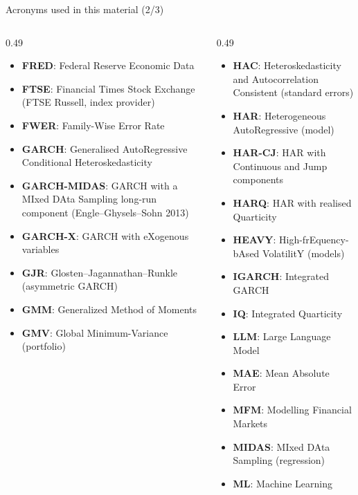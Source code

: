 \begin{frame}{Acronyms used in this material (2/3)}
\begin{columns}[T]
\begin{column}{0.49\textwidth}
\begin{itemize}\setlength{\itemsep}{0pt}
    \item \textbf{FRED}: Federal Reserve Economic Data
    \item \textbf{FTSE}: Financial Times Stock Exchange (FTSE Russell, index provider)
    \item \textbf{FWER}: Family-Wise Error Rate
    \item \textbf{GARCH}: Generalised AutoRegressive Conditional Heteroskedasticity
    \item \textbf{GARCH-MIDAS}: GARCH with a MIxed DAta Sampling long-run component (Engle–Ghysels–Sohn 2013)
    \item \textbf{GARCH-X}: GARCH with eXogenous variables
    \item \textbf{GJR}: Glosten–Jagannathan–Runkle (asymmetric GARCH)
    \item \textbf{GMM}: Generalized Method of Moments
    \item \textbf{GMV}: Global Minimum-Variance (portfolio)
\end{itemize}
\end{column}
\begin{column}{0.49\textwidth}
\begin{itemize}\setlength{\itemsep}{0pt}
    \item \textbf{HAC}: Heteroskedasticity and Autocorrelation Consistent (standard errors)
    \item \textbf{HAR}: Heterogeneous AutoRegressive (model)
    \item \textbf{HAR-CJ}: HAR with Continuous and Jump components
    \item \textbf{HARQ}: HAR with realised Quarticity
    \item \textbf{HEAVY}: High-frEquency-bAsed VolatilitY (models)
    \item \textbf{IGARCH}: Integrated GARCH
    \item \textbf{IQ}: Integrated Quarticity
    \item \textbf{LLM}: Large Language Model
    \item \textbf{MAE}: Mean Absolute Error
    \item \textbf{MFM}: Modelling Financial Markets
    \item \textbf{MIDAS}: MIxed DAta Sampling (regression)
    \item \textbf{ML}: Machine Learning
\end{itemize}
\end{column}
\end{columns}
\end{frame}
